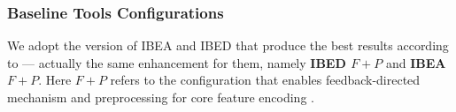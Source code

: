 \subsubsection{Baseline Tools Configurations}
We adopt the version of IBEA and IBED that produce the best results according to \cite{DBLP:conf/issta/TanXCSLD15}\cite{DBLP:journals/asc/XueZT0CC016} --- actually the same enhancement for them, namely \textbf{IBED $F+P$} and \textbf{IBEA $F+P$}. Here $F+P$ refers to the configuration that enables feedback-directed mechanism \cite{DBLP:conf/issta/TanXCSLD15} and preprocessing for core feature encoding \cite{DBLP:journals/tosem/HieronsLLSZ16}.







